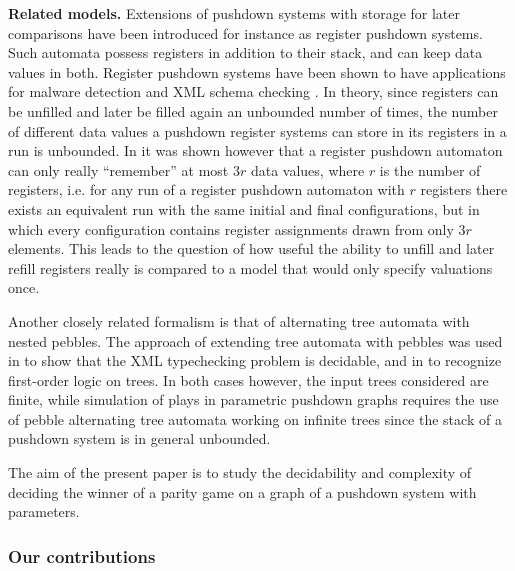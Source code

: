 \documentclass[a4paper,UKenglish,cleveref, autoref, thm-restate]{lipics-v2021}
\begin{document}
{\bf Related models.}
Extensions of pushdown systems with storage for later comparisons
have been introduced for instance as register pushdown systems. 
Such automata possess registers in addition to their stack, and can keep data values in both.
Register pushdown systems have been shown to have applications for malware detection and XML schema checking \cite{senda2021forward, senda2021ltl}. 
In theory, since registers can be unfilled and later be filled again an unbounded number of times, the number of different data values a pushdown register systems can store in its registers in a run is unbounded.  
In \cite{murawski2017reachability} it was shown however that a register pushdown automaton can
only really ``remember'' at most  $3r$ data values, where $r$ is the number of registers,
i.e. for any run of a register pushdown automaton with $r$ registers there exists an equivalent run %
 with the same initial and final conﬁgurations, but in which every configuration contains register assignments drawn from only $3r$ elements. This 
 leads to
 the
  question
  of
   how useful the ability to unfill and later refill registers really is compared to a model that would only specify valuations once.






Another closely related formalism is that of alternating tree automata with nested pebbles. The approach of extending tree automata with pebbles was used in \cite{milo2000typechecking} to show that the XML typechecking problem is decidable, and in \cite{karhumaki2012jewels} to recognize first-order logic on trees. In both cases however, the input trees considered are finite, while 
simulation of plays in parametric pushdown graphs
requires the use of pebble alternating tree automata working on infinite trees
since the stack of a pushdown system is in general unbounded.



The aim of the present paper is to study the decidability and complexity of
deciding
the winner of a parity game on a graph of a pushdown system with  
parameters.


 

\subsubsection*{Our contributions}
\end{document}
